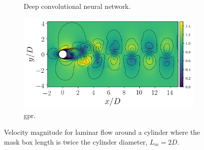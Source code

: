 \documentclass[review]{elsarticle}
\begin{document}
\begin{figure}[!tbp]
\begin{subfigure}[t]{0.45\textwidth}
    \caption{Deep convolutional neural network.}\label{fig:cyl_umagr}%
  \end{subfigure}%
  \hfill%
  \begin{subfigure}[t]{0.45\textwidth}%
    \includegraphics[width=\textwidth]{./figs/cyl_umagi.png}%
    \caption{\gls{gpr}.}\label{fig:cyl_umagi}%
  \end{subfigure}%
  \caption{Velocity magnitude for laminar flow around a cylinder where the mask box length is twice the cylinder diameter, $L_m=2D$.}\label{fig:illustrated_cyl}%
\end{figure}%
\end{document}
